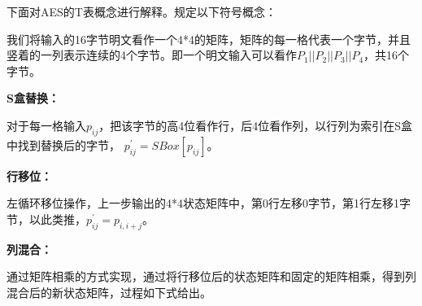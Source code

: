 下面对AES的T表概念进行解释。规定以下符号概念：

\begin{table}[H]
	\centering
	\caption{符号解释}
	\label{table1}
\end{table}

我们将输入的16字节明文看作一个4*4的矩阵，矩阵的每一格代表一个字节，并且竖着的一列表示连续的4个字节。即一个明文输入可以看作${P_1}||{P_2}||{P_3}||{P_4}$，共16个字节。

\textbf{S盒替换：}

对于每一格输入${p_{ij}}$，把该字节的高4位看作行，后4位看作列，以行列为索引在S盒中找到替换后的字节， $p_{ij}^{'} = SBox\left[ {{p_{ij}}} \right]$。

\textbf{行移位：}

左循环移位操作，上一步输出的4*4状态矩阵中，第0行左移0字节，第1行左移1字节，以此类推，$p_{ij}^{'} = {p_{i,i + j}}$。

\textbf{列混合：}

通过矩阵相乘的方式实现，通过将行移位后的状态矩阵和固定的矩阵相乘，得到列混合后的新状态矩阵，过程如下式给出。

